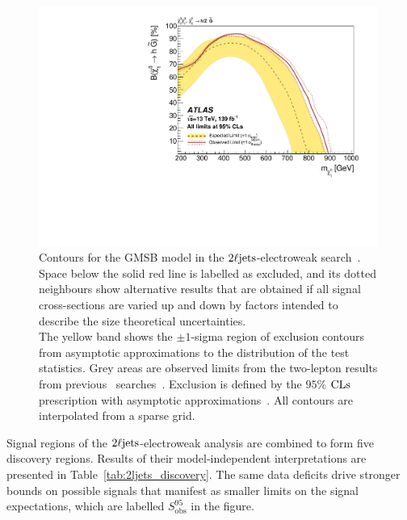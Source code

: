 \begin{figure}[tp]
\centering
\includegraphics[width=0.99\textwidth]{figures/2ljets_contours_gmsb.pdf}
\caption[
Contours for the GMSB model in the $\twoljets$-electroweak search
]{%
Contours for the GMSB model in the $\twoljets$-electroweak
search~\cite{atlas2022searches}.
\\[0.5em]
Space below the solid red line is labelled as excluded, and its dotted
neighbours show alternative results that are obtained if all signal
cross-sections are varied up and down by factors intended to describe the size
theoretical uncertainties.
\\[0.5em]
The yellow band shows the $\pm1$-sigma region of exclusion contours
from asymptotic approximations to the distribution of the test statistics.
Grey areas are observed limits from the two-lepton results from previous
\atlas\ searches~\cite{atlas_23l_SUSY_2016_24, atlas_2l_SUSY_2013_11}.
Exclusion is defined by the $95\%$ $\mathrm{CLs}$ prescription
with asymptotic approximations~\cite{Cowan:2010js}.
All contours are interpolated from a sparse grid.
}
\label{fig:2ljets_contours_gmsb}
\end{figure}

Signal regions of the $\twoljets$-electroweak analysis are combined to form
five discovery regions.
Results of their model-independent interpretations are presented in
Table~\ref{tab:2ljets_discovery}.
The same data deficits drive stronger bounds on possible signals that manifest
as smaller limits on the signal expectations, which are labelled
$S_{\mathrm{obs}}^{95}$ in the figure.

